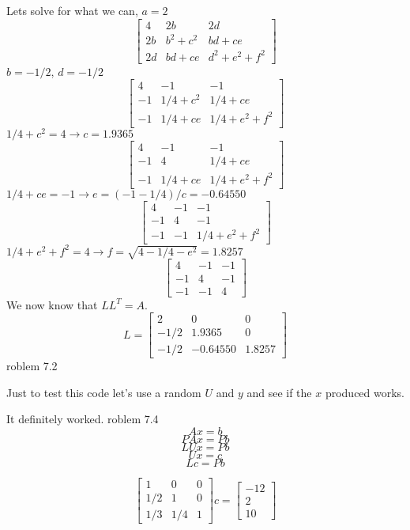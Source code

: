 \documentclass[12pt]{article}
\makeatletter
\theoremstyle{homework}
\newenvironment{exercise}[1]
{\def\@currentlabel{#1}\exercisecore}
{\endexercisecore}
\makeatother
\begin{document}
Lets solve for what we can, $a=2$
$$\begin{bmatrix}
4 & 2b & 2d\\
2b & b^2+c^2 & bd+ce\\
2d & bd+ce & d^2+e^2+f^2
\end{bmatrix}$$
$b=-1/2$, $d=-1/2$\\
$$\begin{bmatrix}
4 & -1 & -1\\
-1 & 1/4+c^2 & 1/4+ce\\
-1 & 1/4+ce & 1/4+e^2+f^2
\end{bmatrix}$$
$1/4+c^2=4\rightarrow c=1.9365$
$$\begin{bmatrix}
4 & -1 & -1\\
-1 & 4 & 1/4+ce\\
-1 & 1/4+ce & 1/4+e^2+f^2
\end{bmatrix}$$
$1/4+ce=-1\rightarrow e=(-1-1/4)/c=-0.64550$
$$\begin{bmatrix}
4 & -1 & -1\\
-1 & 4 & -1\\
-1 & -1 & 1/4+e^2+f^2
\end{bmatrix}$$
$1/4+e^2+f^2=4\rightarrow f=\sqrt{4-1/4-e^2}=1.8257$
$$\begin{bmatrix}
4 & -1 & -1\\
-1 & 4 & -1\\
-1 & -1 & 4
\end{bmatrix}$$
We now know that $LL^T=A$.
$$L=\begin{bmatrix}
2 & 0 & 0\\
-1/2 & 1.9365 & 0\\
-1/2 & -0.64550 & 1.8257
\end{bmatrix}$$
\begin{exercise}

Problem 7.2
\end{exercise}

Just to test this code let's use a random $U$ and $y$ and see if the $x$ produced works.
\newpage

It definitely worked.
\begin{exercise}

Problem 7.4
\end{exercise}
$$Ax=b$$
$$PAx=Pb$$
$$LUx=Pb$$
$$Ux=c$$
$$Lc=Pb$$

$$\begin{bmatrix}
1&0&0\\
1/2&1&0\\
1/3&1/4&1
\end{bmatrix}
c=\begin{bmatrix}
-12\\
2\\
10
\end{bmatrix}$$
\end{document}
